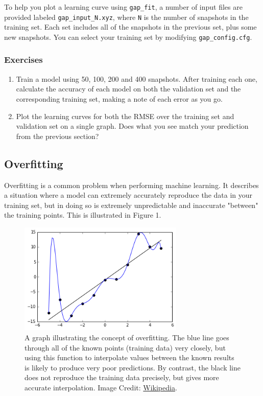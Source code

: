 \documentclass{article}
\begin{document}
To help you plot a learning curve using \verb|gap_fit|, a number of input files are provided labeled \verb|gap_input_N.xyz|, where \verb|N| is the number of snapshots in the training set. Each set includes all of the snapshots in the previous set, plus some new snapshots. You can select your training set by modifying \verb|gap_config.cfg|.

\subsubsection*{Exercises}

\begin{enumerate}

\item Train a model using 50, 100, 200 and 400 snapshots. After training each one, calculate the accuracy of each model on both the validation set and the corresponding training set, making a note of each error as you go.
\item Plot the learning curves for both the RMSE over the training set and validation set on a single graph. Does what you see match your prediction from the previous section?

\end{enumerate}

\subsection{Overfitting}

Overfitting is a common problem when performing machine learning. It describes a situation where a model can extremely accurately reproduce the data in your training set, but in doing so is extremely unpredictable and inaccurate "between" the training points. This is illustrated in Figure 1.

\begin{figure}[t]

\centering

\includegraphics[width=0.7\textwidth]{Overfitted_Data.png}
\caption{A graph illustrating the concept of overfitting. The blue line goes through all of the known points (training data) very closely, but using this function to interpolate values between the known results is likely to produce very poor predictions. By contrast, the black line does not reproduce the training data precisely, but gives more accurate interpolation. Image Credit: \href{https://en.wikipedia.org/wiki/Overfitting}{Wikipedia}.}

\end{figure}
\end{document}
